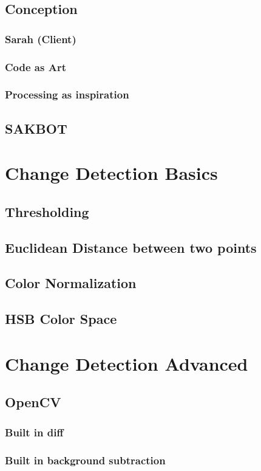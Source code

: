 \documentclass[a4paper]{report}
\begin{document}
\subsection{Conception}
\subsubsection{Sarah (Client)}
\subsubsection{Code as Art}
\subsubsection{Processing as inspiration}
\subsection{SAKBOT}

\section{Change Detection Basics}
\subsection{Thresholding}
\subsection{Euclidean Distance between two points}
\subsection{Color Normalization}
\subsection{HSB Color Space}

\section{Change Detection Advanced}
\subsection{OpenCV}
\subsubsection{Built in diff}
\subsubsection{Built in background subtraction}
\end{document}
